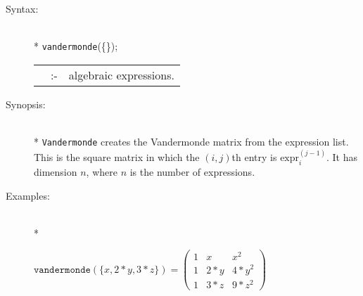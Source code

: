 \begin{description}
\item[Syntax:]\mbox{}\\*
\texttt{vandermonde}(\{\exprlist{}\});
\lazyfootnote{}\\[2mm]
\begin{tabular}{l l l}
\exprlist{} &:-& algebraic expressions.
\end{tabular}

\item[Synopsis:]\mbox{}\\*
  \texttt{Vandermonde} creates the Vandermonde matrix from the expression list.
  This is the square matrix in which the $(i,j)$th entry is $\text{expr}_i^{(j-1)}$.
  It has dimension $n$, where $n$ is the number of expressions.

\item[Examples:]\mbox{}\\*
\begin{flushleft}  
\begin{math}  
  \texttt{vandermonde}(\{x,2*y,3*z\}) =
  \begin{pmatrix} 1 & x & x^2 \\ 1 & 2*y & 4*y^2 \\ 1 & 3*z & 9*z^2 \end{pmatrix}
\end{math}  
\end{flushleft}
\end{description}

